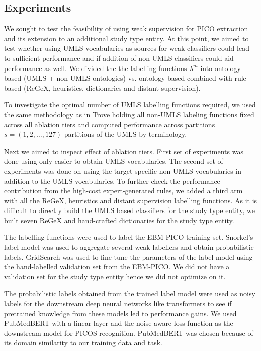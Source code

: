 \documentclass[10.7pt,]{article}
\begin{document}
\subsection{Experiments}\label{transformers}
%
We sought to test the feasibility of using weak supervision for PICO extraction and its extension to an additional study type entity.
At this point, we aimed to test whether using UMLS vocabularies as sources for weak classifiers could lead to sufficient performance and if addition of non-UMLS classifiers could aid performance as well.
We divided the the labelling functions $\lambda^{m}$ into ontology-based (UMLS + non-UMLS ontologies) vs. ontology-based combined with rule-based (ReGeX, heuristics, dictionaries and distant supervision). 


To investigate the optimal number of UMLS labelling functions required, we used the same methodology as in Trove holding all non-UMLS labeling functions fixed across all ablation tiers and computed performance across partitions = $s = ( 1, 2, \dotso , 127 )$ partitions of the UMLS by terminology. 


Next we aimed to inspect effect of ablation tiers.
First set of experiments was done using only easier to obtain UMLS vocabularies.
The second set of experiments was done on using the target-specific non-UMLS vocabularies in addition to the UMLS vocabularies. 
To further check the performance contribution from the high-cost expert-generated rules, we added a third arm with all the ReGeX, heuristics and distant supervision labelling functions.
As it is difficult to directly build the UMLS based classifiers for the study type entity, we built seven ReGeX and hand-crafted dictionaries for the study type entity.


The labelling functions were used to label the EBM-PICO training set. 
Snorkel's label model was used to aggregate several weak labellers and obtain probabilistic labels.
GridSearch was used to fine tune the parameters of the label model using the hand-labelled validation set from the EBM-PICO. %
We did not have a validation set for the study type entity hence we did not optimize on it.

The probabilistic labels obtained from the trained label model were used as noisy labels for the downstream deep neural networks like transformers to see if pretrained knowledge from these models led to performance gains.
We used PubMedBERT with a linear layer and the noise-aware loss function as the downstream model for PICOS recognition.
PubMedBERT was chosen because of its domain similarity to our training data and task.
%
%
%
\end{document}
